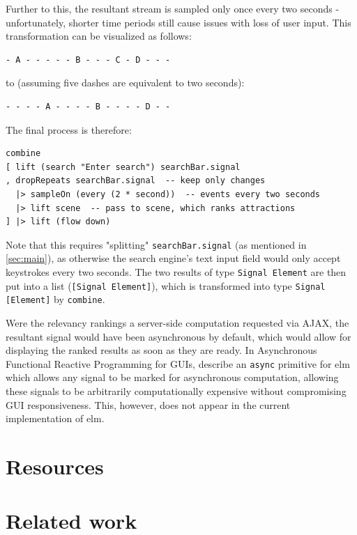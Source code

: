 \documentclass[12pt]{article}
\begin{document}
Further to this, the resultant stream is sampled only once every two seconds - unfortunately, shorter time periods still cause issues with loss of user input. This transformation can be visualized as follows:
\begin{samepage}
\begin{verbatim}
- A - - - - - B - - - C - D - - -
\end{verbatim}
to (assuming five dashes are equivalent to two seconds):
\begin{verbatim}
- - - - A - - - - B - - - - D - -
\end{verbatim}
\end{samepage}
The final process is therefore:
\begin{samepage}
\begin{verbatim}
combine
[ lift (search "Enter search") searchBar.signal
, dropRepeats searchBar.signal  -- keep only changes
  |> sampleOn (every (2 * second))  -- events every two seconds
  |> lift scene  -- pass to scene, which ranks attractions
] |> lift (flow down)
\end{verbatim}
\end{samepage}
Note that this requires "splitting" \texttt{searchBar.signal} (as mentioned in \ref{sec:main}), as otherwise the search engine's text input field would only accept keystrokes every two seconds. The two results of type \texttt{Signal Element} are then put into a list (\texttt{[Signal Element]}), which is transformed into type \texttt{Signal [Element]} by \texttt{combine}.

Were the relevancy rankings a server-side computation requested via AJAX, the resultant signal would have been asynchronous by default, which would allow for displaying the ranked results as soon as they are ready. In Asynchronous Functional Reactive Programming for GUIs, \cite{czaplicki_chong_2013} describe an \texttt{async} primitive for elm which allows any signal to be marked for asynchronous computation, allowing these signals to be arbitrarily computationally expensive without compromising GUI responsiveness. This, however, does not appear in the current implementation of elm.
\section{Resources}

\section{Related work}
\end{document}
